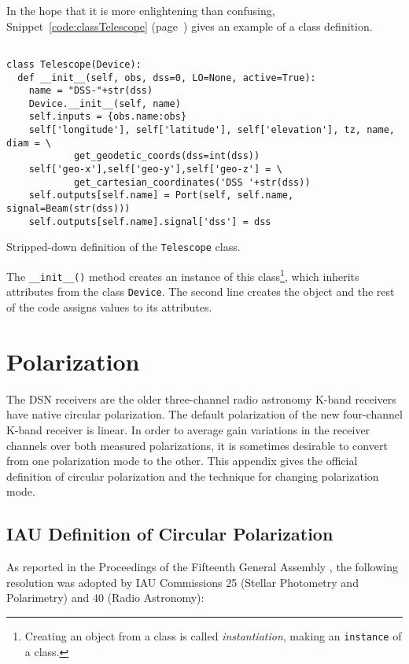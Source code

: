 \documentclass[letterpaper,11pt]{book}
\begin{document}
In the hope that it is more enlightening than confusing, 
Snippet~\ref{code:classTelescope} (page~\pageref{code:classTelescope}) gives an
example of a class definition.
\begin{code}[h!tb]
\begin{center}
\begin{verbatim}
  
class Telescope(Device):
  def __init__(self, obs, dss=0, LO=None, active=True):
    name = "DSS-"+str(dss)
    Device.__init__(self, name)
    self.inputs = {obs.name:obs}
    self['longitude'], self['latitude'], self['elevation'], tz, name, diam = \
            get_geodetic_coords(dss=int(dss))
    self['geo-x'],self['geo-y'],self['geo-z'] = \
            get_cartesian_coordinates('DSS '+str(dss))
    self.outputs[self.name] = Port(self, self.name, signal=Beam(str(dss)))
    self.outputs[self.name].signal['dss'] = dss\end{verbatim}
\caption{\label{code:classTelescope}Stripped-down definition of the 
{\tt Telescope} class.}
\end{center}
\end{code}
The {\tt \_\_init\_\_()} method creates an instance of this 
class\footnote{Creating an object from a class is called {\it instantiation},
making an {\tt instance} of a class.}, which 
inherits attributes from the class {\tt Device}. The second line creates the 
object and the rest of the code assigns values to its attributes.


\chapter{Polarization}\label{app:pol}

The DSN receivers are the older three-channel radio astronomy K-band receivers
have native circular polarization.  The default polarization of the new
four-channel K-band receiver is linear. In order to average gain variations in
the receiver channels over both measured polarizations, it is sometimes
desirable to convert from one polarization mode to the other. This appendix
gives the official definition of circular polarization and the technique for
changing polarization mode.

\section{IAU Definition of Circular Polarization}

As reported in the Proceedings of the Fifteenth General Assembly \cite{IAU1974},
the following resolution was adopted by IAU Commissions 25 (Stellar Photometry
and Polarimetry) and 40 (Radio Astronomy):
\end{document}
